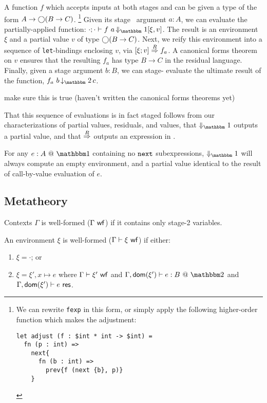 A function $f$ which accepts inputs at both stages \bbone{} and \bbtwo{} can be
given a type of the form $A\to\bigcirc(B\to C)$.%
\cprotect\footnote{We can rewrite \texttt{fexp} in this form, or simply apply
the following higher-order function which makes the adjustment:
\begin{lstlisting} 
let adjust (f : $int * int -> $int) =
  fn (p : int) => 
    next{
      fn (b : int) => 
        prev{f (next {b}, p)}
    }
\end{lstlisting}}
%
Given its stage \bbone\ argument $a:A$, we can evaluate the partially-applied
function:
$\cdot;\cdot\vdash f~a \mathop{\redonesym} [\xi,v]$.
The result is an environment $\xi$ and a partial value $v$ of type $\bigcirc(B\to
C)$. Next, we reify this environment into a sequence of \verb|let|-bindings
enclosing $v$, via $[{\xi};{v}]\overset{R}\Rightarrow{f_a}$. A canonical forms theorem on $v$
ensures that the resulting $f_a$ has type $B\to C$ in the residual language.
Finally, given a stage \bbtwo{} argument $b:B$, we can stage-\bbtwo{} evaluate
the ultimate result of the function, $f_a~b \mathop{\tworedsym} c$.

\TODO make sure this is true (haven't written the canonical forms theorems yet)

That this sequence of evaluations is in fact staged follows from our
characterizations of partial values, residuals, and values, that $\redonesym$
outputs a partial value, and that $\overset{R}\Rightarrow$ outputs an expression in \langTwo.

\begin{remark}
For any $\colone{e}{A}$ containing no ${\tt next}$ subexpressions, $\redonesym$ will
always compute an empty environment, and a partial value identical to the result
of call-by-value evaluation of $e$.
\end{remark}

\subsection{Metatheory}

\begin{definition}
Contexts $\Gamma$ is well-formed ($\Gamma\ \mathsf{wf}$) if it
contains only stage-2 variables.
\end{definition}

\begin{definition}
An environment $\xi$ is well-formed ($\Gamma\vdash\xi\ \mathsf{wf}$) if either:
\begin{enumerate}
\item $\xi = \cdot$; or
\item $\xi = \xi',x\mapsto e$ where
$\Gamma\vdash\xi'\ \mathsf{wf}$ and
$\Gamma,\dom{\xi'}\vdash \coltwo{e}{B}$ and
$\Gamma,\mathsf{dom}(\xi')\vdash e \ \mathsf{res}$.
\end{enumerate}
\end{definition}

